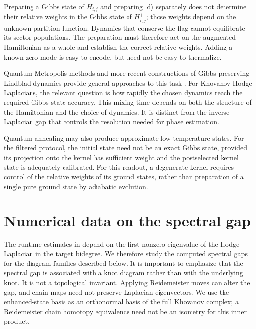 \documentclass[a4paper,onecolumn,unpublished]{quantumarticle}
\theoremstyle{plain}
\theoremstyle{definition}
\theoremstyle{definition}
\numberwithin{equation}{section}
\begin{document}
Preparing a Gibbs state of $H_{i,j}$ and
preparing $|\mathrm d\rangle$ separately does not determine
their relative weights in the Gibbs state of $H^+_{i,j}$;
those weights depend on the unknown partition function.
Dynamics that conserve the flag cannot equilibrate its sector
populations. The preparation must therefore act on the augmented
Hamiltonian as a whole and establish the correct relative weights.
Adding a known zero mode is easy to encode, but need not be easy
to thermalize.

Quantum Metropolis methods and more recent constructions of
Gibbs-preserving Lindblad dynamics provide general approaches
to this task \cite{TemmeEtAl11,GilyenThermal23,LinLinThermal24}.
For Khovanov Hodge Laplacians, the relevant question is how rapidly
the chosen dynamics reach the required Gibbs-state accuracy.
This mixing time depends on both the structure of the Hamiltonian
and the choice of dynamics. It is distinct from the inverse Laplacian
gap that controls the resolution needed for phase estimation.

Quantum annealing may also produce approximate low-temperature states.
For the filtered protocol, the initial state need not be an exact
Gibbs state, provided its projection onto the kernel has sufficient
weight and the postselected kernel state is adequately calibrated.
For this readout, a degenerate kernel requires control of the relative
weights of its ground states, rather than preparation of a single
pure ground state by adiabatic evolution.




\section{Numerical data on the spectral gap}
\label{sec:numerics_gap}
The runtime estimates in  depend on the first
nonzero eigenvalue of the Hodge Laplacian in the target bidegree. We therefore
study the computed spectral gaps for the diagram families described below.
It is important to emphasize that the spectral gap is associated with a knot
diagram rather than with the underlying knot. It is not a topological invariant.
Applying Reidemeister moves can alter the gap, and chain maps need not preserve
Laplacian eigenvectors. We use the enhanced-state basis as an orthonormal basis
of the full Khovanov complex; a Reidemeister chain homotopy equivalence need not
be an isometry for this inner product.
\end{document}
